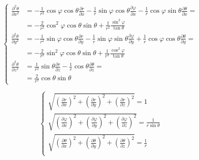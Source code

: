 \documentclass
[
a4paper,                      %
twoside,					  %
12pt,                         %
abstract,		      %
fleqn,                        %
]
{scrartcl} %
\begin{document}
\begin{description}
\begin{equation}
\begin{cases}
\frac{\partial^{2} \theta}{\partial x^{2}}&=-\frac{1}{r^{2}}\cos{\varphi}\cos{\theta}\frac{\partial r}{\partial x}-\frac{1}{r}\sin{\varphi}\cos{\theta}\frac{\partial \varphi}{\partial x}-\frac{1}{r}\cos{\varphi}\sin{\theta}\frac{\partial \theta}{\partial x}=\\
&=-\frac{2}{r^{2}}\cos^{2}{\varphi}\cos{\theta}\sin{\theta}+\frac{1}{r^{2}}\frac{\sin^{2}{\varphi}}{\tan{\theta}}\\
\frac{\partial^{2} \theta}{\partial y^{2}}&=-\frac{1}{r^{2}}\sin{\varphi}\cos{\theta}\frac{\partial r}{\partial y}-\frac{1}{r}\sin{\varphi}\sin{\theta}\frac{\partial \varphi}{\partial y}+\frac{1}{r}\cos{\varphi}\cos{\theta}\frac{\partial \theta}{\partial y}=\\
&=-\frac{2}{r^{2}}\sin^{2}{\varphi}\cos{\theta}\sin{\theta}+\frac{1}{r^{2}}\frac{\cos^{2}{\varphi}}{\tan{\theta}}\\
\frac{\partial^{2}\theta}{\partial z^{2}}&=\frac{1}{r^{2}}\sin{\theta}\frac{\partial r}{\partial z}-\frac{1}{r}\cos{\theta}\frac{\partial\theta}{\partial z}=\\
&=\frac{2}{r^{2}}\cos{\theta}\sin{\theta}
\end{cases}
\end{equation}

\begin{equation}
\begin{cases}
\sqrt{\left(\frac{\partial r}{\partial x}\right)^{2}+\left(\frac{\partial r}{\partial y}\right)^{2}+\left(\frac{\partial r}{\partial z}\right)^{2}}=1\\
\sqrt{\left(\frac{\partial\varphi}{\partial x}\right)^{2}+\left(\frac{\partial\varphi}{\partial y}\right)^{2}+\left(\frac{\partial\varphi}{\partial z}\right)^{2}}=\frac{1}{r\sin{\theta}}\\
\sqrt{\left(\frac{\partial\theta}{\partial x}\right)^{2}+\left(\frac{\partial\theta}{\partial y}\right)^{2}+\left(\frac{\partial\theta}{\partial z}\right)^{2}}=\frac{1}{r}\\
\end{cases}
\end{equation}


\end{description}
\end{document}
